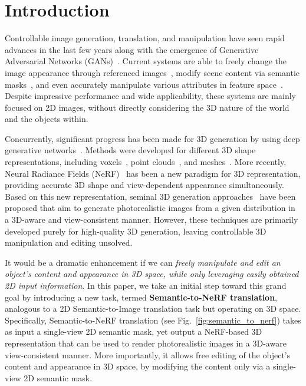 \documentclass[runningheads]{llncs}
\begin{document}
\section{Introduction} \label{sec:intro}


    
Controllable image generation, translation, and manipulation have seen rapid advances in the last few years along with the emergence of Generative Adversarial Networks (GANs)~\cite{goodfellow2014generative}. Current systems are able to freely change the image appearance through referenced images~\cite{johnson2016perceptual,zhu2017unpaired,isola2017image}, modify scene content via semantic masks~\cite{wang2018high,park2019semantic,ling2021editgan}, and even accurately manipulate various attributes in feature space~\cite{karras2019style,wu2021stylespace,wu2021stylealign}. Despite impressive performance and wide applicability, these systems are mainly focused on 2D images, without directly considering the 3D nature of the world and the objects within. 

Concurrently, significant progress has been made for 3D generation by using deep generative networks~\cite{goodfellow2014generative,kingma2014adam}. Methods were developed for different 3D shape representations, including voxels~\cite{wu2016learning}, point clouds~\cite{luo2021diffusion}, and meshes~\cite{goel2020shape}. More recently, Neural Radiance Fields (NeRF)~\cite{mildenhall2020nerf} has been a new paradigm for 3D representation, providing accurate 3D shape and view-dependent appearance simultaneously. Based on this new representation, seminal 3D generation approaches~\cite{schwarz2020graf,niemeyer2021giraffe,chan2021pi,gu2021stylenerf,chan2021efficient} have been proposed that aim to generate photorealistic images from a given distribution in a 3D-aware and view-consistent manner. However, these techniques are primarily developed purely for high-quality 3D generation, leaving controllable 3D manipulation and editing unsolved.

It would be a dramatic enhancement if we can \emph{freely manipulate and edit an object's content and appearance in 3D space, while only leveraging easily obtained 2D input information}. In this paper, we take an initial step toward this grand goal by introducing a new task, termed \textbf{Semantic-to-NeRF translation}, analogous to a 2D Semantic-to-Image translation task but operating on 3D space. Specifically, Semantic-to-NeRF translation (see Fig.~\ref{fig:semantic_to_nerf}) takes as input a single-view 2D semantic mask, yet output a NeRF-based 3D representation that can be used to render photorealistic images in a 3D-aware view-consistent manner. More importantly, it allows free editing of the object's content and appearance in 3D space, by modifying the content only via a single-view 2D semantic mask.
\end{document}

